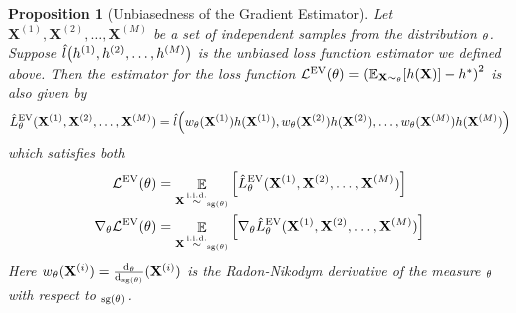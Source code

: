 \documentclass{article}
\theoremstyle{plain}
\newtheorem{proposition}[theorem]{Proposition}
\theoremstyle{definition}
\theoremstyle{remark}
\let\P\relax
\DeclareMathOperator{\P}{\mathbb{P}}
\DeclareMathOperator{\E}{\mathbb{E}}
\DeclareMathOperator{\sg}{\mathrm{sg}}
\DeclareMathOperator{\iid}{\overset{\mathrm{i.i.d.}}{\sim}}
\begin{document}
\begin{proposition}[Unbiasedness of the Gradient Estimator]\label{prop:unbiasedness_gradient}
    Let $\mathbf{X}^{(1)}, \mathbf{X}^{(2)}, \dots, \mathbf{X}^{(M)}$ be a set of independent samples from the distribution $\P_\theta$. Suppose $\hat{l}\qty(h^{(1)}, h^{(2)}, \dots, h^{(M)})$ is the unbiased loss function estimator we defined above. Then the estimator for the loss function $\mathcal{L}^\text{EV}(\theta) = \qty(\mathbb{E}_{\mathbf{X} \sim \P_\theta} \qty[h(\mathbf{X})] - h^*)^2$ is also given by
    \begin{equation}
        \hat{L}^\text{EV}_\theta(\mathbf{X}^{(1)}, \mathbf{X}^{(2)}, \dots, \mathbf{X}^{(M)}) = \hat{l}\qty(w_\theta(\mathbf{X}^{(1)})h(\mathbf{X}^{(1)}), w_\theta(\mathbf{X}^{(2)})h(\mathbf{X}^{(2)}), \dots, w_\theta(\mathbf{X}^{(M)})h(\mathbf{X}^{(M)}))
    \end{equation}
    which satisfies both
    \begin{align}
        \label{eq:unbias_loss}
        \mathcal{L}^\text{EV}(\theta) & = \E_{\mathbf{X} \iid \P_{\sg(\theta)}}\qty[\hat{L}_\theta^\text{EV}(\mathbf{X}^{(1)}, \mathbf{X}^{(2)}, \dots, \mathbf{X}^{(M)})] \\ 
        \label{eq:unbias_grad}
        \nabla_\theta\mathcal{L}^\text{EV}(\theta) & = \E_{\mathbf{X} \iid \P_{\sg(\theta)}}\qty[\nabla_\theta\hat{L}_\theta^\text{EV}(\mathbf{X}^{(1)}, \mathbf{X}^{(2)}, \dots, \mathbf{X}^{(M)})]
    \end{align}
    Here $w_\theta(\mathbf{X}^{(i)}) = \frac{\dd \P_\theta}{\dd \P_{\sg(\theta)}}(\mathbf{X}^{(i)})$ is the Radon-Nikodym derivative of the measure $\P_\theta$ with respect to $\P_{\sg(\theta)}$.
\end{proposition}
\end{document}
